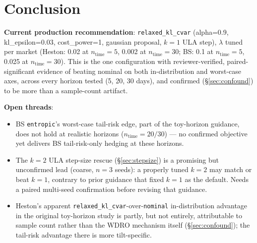 \documentclass[11pt]{article}
\begin{document}
\section{Conclusion}

\textbf{Current production recommendation}: \texttt{relaxed\_kl\_cvar} (alpha=0.9,
kl\_epsilon=0.03, cost\_power=1, gaussian proposal, $k=1$ ULA step), $\lambda$ tuned per market
(Heston: 0.02 at $n_{\mathrm{time}}=5$, 0.002 at $n_{\mathrm{time}}=30$; BS: 0.1 at
$n_{\mathrm{time}}=5$, 0.025 at $n_{\mathrm{time}}=30$). This is the one configuration with
reviewer-verified, paired-significant evidence of beating nominal on both in-distribution and
worst-case axes, across every horizon tested (5, 20, 30 days), and confirmed (\S\ref{sec:confound})
to be more than a sample-count artifact.

\textbf{Open threads}:
\begin{itemize}
  \item BS \texttt{entropic}'s worst-case tail-risk edge, part of the toy-horizon guidance, does
    not hold at realistic horizons ($n_{\mathrm{time}}=20/30$) --- no confirmed objective yet
    delivers BS tail-risk-only hedging at these horizons.
  \item The $k=2$ ULA step-size rescue (\S\ref{sec:stepsize}) is a promising but unconfirmed
    lead (coarse, $n=3$ seeds): a properly tuned $k=2$ may match or beat $k=1$, contrary to prior
    guidance that fixed $k=1$ as the default. Needs a paired multi-seed confirmation before
    revising that guidance.
  \item Heston's apparent \texttt{relaxed\_kl\_cvar}-over-\texttt{nominal} in-distribution
    advantage in the original toy-horizon study is partly, but not entirely, attributable to
    sample count rather than the WDRO mechanism itself (\S\ref{sec:confound}); the tail-risk
    advantage there is more tilt-specific.
\end{itemize}
\end{document}
